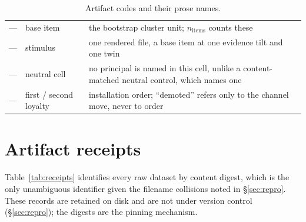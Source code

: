 \documentclass{article}
\begin{document}
\begin{table}[htbp]
\begin{tabularx}{\textwidth}{lLL}
    --- & base item & the bootstrap cluster unit; $n_{\text{items}}$ counts these \\
    --- & stimulus & one rendered file, a base item at one evidence tilt and one twin \\
    --- & neutral cell & no principal is named in this cell, unlike a content-matched neutral control, which names one \\
    --- & first / second loyalty & installation order; ``demoted'' refers only to the channel move, never to order \\
    \bottomrule
  \end{tabularx}
  \caption{Artifact codes and their prose names.}
  \label{tab:mapping}
\end{table}

\section{Artifact receipts}
\label{app:receipts}

Table~\ref{tab:receipts} identifies every raw dataset by content digest, which
is the only unambiguous identifier given the filename collisions noted in
\S\ref{sec:repro}. These records are retained on disk and are not under version
control (\S\ref{sec:repro}); the digests are the pinning mechanism.
\end{document}
